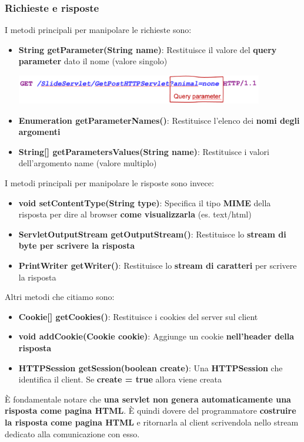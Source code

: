 \documentclass[12pt]{article}
\begin{document}
\subsubsection{Richieste e risposte}
I metodi principali per manipolare le richieste sono:
\begin{itemize}
    \item \textbf{String getParameter(String name)}: Restituisce il valore del \textbf{query parameter} dato il nome (valore singolo)
    \begin{center}
        \includegraphics[width = 0.85\textwidth]{Images/185.png}
    \end{center}
    \item \textbf{Enumeration getParameterNames()}: Restituisce l'elenco dei \textbf{nomi degli argomenti}
    \item \textbf{String[] getParametersValues(String name)}: Restituisce i valori dell'argomento name (valore multiplo)
\end{itemize}
I metodi principali per manipolare le risposte sono invece:
\begin{itemize}
    \item \textbf{void setContentType(String type)}: Specifica il tipo \textbf{MIME} della risposta per dire al browser \textbf{come visualizzarla} (es. text/html)
    \item \textbf{ServletOutputStream getOutputStream()}: Restituisce lo \textbf{stream di byte per scrivere la risposta}
    \item \textbf{PrintWriter getWriter()}: Restituisce lo \textbf{stream di caratteri} per scrivere la risposta
\end{itemize}
Altri metodi che citiamo sono:
\begin{itemize}
    \item \textbf{Cookie[] getCookies()}: Restituisce i cookies del server sul client
    \item \textbf{void addCookie(Cookie cookie)}: Aggiunge un cookie \textbf{nell'header della risposta}
    \item \textbf{HTTPSession getSession(boolean create)}: Una \textbf{HTTPSession} che identifica il client. Se \textbf{create = true} allora viene creata
\end{itemize}
È fondamentale notare che \textbf{una servlet non genera automaticamente una risposta come pagina HTML}. È quindi dovere del programmatore \textbf{costruire la risposta come pagina HTML} e ritornarla al client
scrivendola nello stream dedicato alla comunicazione con esso.
\end{document}
